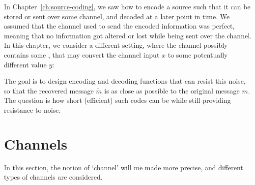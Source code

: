 In Chapter~\ref{ch:source-coding}, we saw how to encode a source such that it can be stored or sent over some channel, and decoded at a later point in time. We assumed that the channel used to send the encoded information was perfect, meaning that no information got altered or lost while being sent over the channel. In this chapter, we consider a different setting, where the channel possibly contains some , that may convert the channel input $x$ to some potentually different value $y$:

\begin{figure}[h]
\begin{center}
\end{center}
\end{figure}
The goal is to design encoding and decoding functions that can resist this noise, so that the recovered message $\tilde{m}$ is as close as possible to the original message $m$. The question is how short (efficient) such codes can be while still providing resistance to noise.

\section{Channels}
In this section, the notion of `channel' will me made more precise, and different types of channels are considered.

